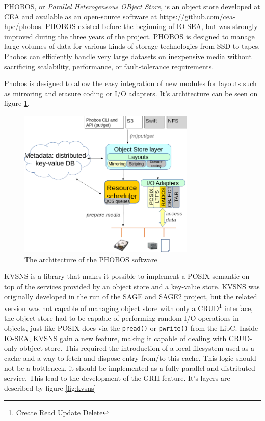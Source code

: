 PHOBOS, or \textit{Parallel Heterogeneous OBject Store}, is an object store developed at CEA and available as an
open-source software at \url{https://github.com/cea-hpc/phobos}. PHOBOS existed before the beginning of IO-SEA,
but was strongly improved during the three years of the project. PHOBOS is designed to manage large volumes of
data for various kinds of storage technologies from SSD to tapes. Phobos can efficiently handle very large
datasets on inexpensive media without sacrificing scalability, performance, or fault-tolerance requirements.

Phobos is designed to allow the easy integration of new modules for layouts such as mirroring and erasure coding
or I/O adapters. It's architecture can be seen on figure \ref{fig:phobos}. 

\begin{figure}[H]
    \centering
    \includegraphics[width=0.75\textwidth]{FIGS/phobos.png}
    \caption[PHOBOS architecture]{ The architecture of the PHOBOS software}
    \label{fig:phobos}
\end{figure}

KVSNS is a library that makes it possible to implement a POSIX semantic on top of the services provided by an
object store and a key-value store. KVSNS was originally developed in the run of the SAGE and SAGE2 project, but
the related version was not capable of managing object store with only a CRUD\footnote{Create Read Update Delete}
interface, the object store had to be capable of performing random I/O operations in objects, just like POSIX
does via the \verb|pread()| or \verb|pwrite()| from the LibC. Inside IO-SEA, KVSNS gain a new feature, making it
capable of dealing with CRUD-only obbject store. This required the introduction of a local filesystem used as
a cache and a way to fetch and dispose entry from/to this cache. This logic should not be a bottleneck, it should
be implemented as a fully parallel and distributed service. This lead to the development of the GRH feature.
It's layers are described by figure \ref{fig:kvsns}

